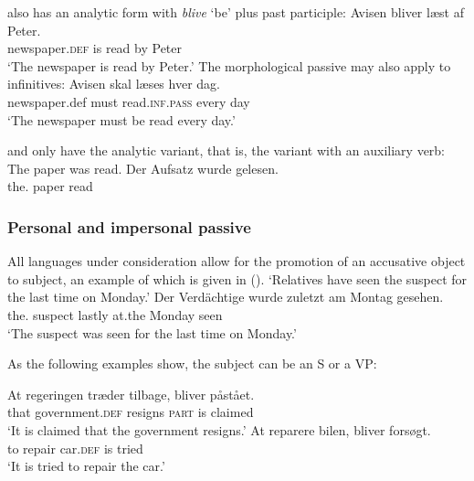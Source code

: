 \noindent
{} also has an analytic form with \emph{blive} `be' plus past participle: 
\ea
\gll Avisen                 bliver læst af Peter.\\
     newspaper.\textsc{def} is     read by Peter\\\danish
\glt `The newspaper is read by Peter.'
\z
The morphological passive may also apply to infinitives:
\ea
\gll Avisen skal læses hver dag.\\
     newspaper.def must read.\textsc{inf}.\textsc{pass} every day\\\danish
\glt `The newspaper must be read every day.'
\z

\noindent
{} and  only have the analytic variant, that is, the variant with an
auxiliary verb:
\eal
\ex The paper was read.
\ex 
\gll Der        Aufsatz wurde  gelesen.\\
     the.\NOM{} paper   \AUX{} read\\\german
\zl    





\subsubsection{Personal and impersonal passive}
\label{sec-impersonal-passive-phen}

All languages under consideration allow for the promotion of an accusative object to subject, an
example of which is given in ().
\eal
\ex
{}
\glt `Relatives have seen the suspect for the last time on Monday.'
\ex 
\gll Der        Verdächtige wurde  zuletzt am Montag gesehen.\\
     the.\NOM{} suspect     \AUX{} lastly at.the Monday seen\\
\glt `The suspect was seen for the last time on Monday.'
\zl

\noindent
As the following examples show, the subject can be an S or a VP:

\eal
\ex
\gll At regeringen træder tilbage, bliver påstået.\\
     that government.\textsc{def} resigns \textsc{part} is claimed\\\danish
\glt `It is claimed that the government resigns.'
\ex
\gll At reparere bilen, bliver forsøgt.\\
     to repair car.\textsc{def} is tried\\
\glt `It is tried to repair the car.'
\zl

